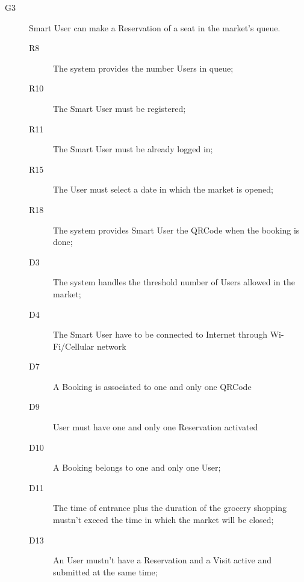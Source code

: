 \begin{description}
    \item[G3]Smart User can make a Reservation of a seat in the market's queue.
    \begin{description}
    \item[R8] The system provides the number Users in queue; %
    \item[R10] The Smart User must be registered;
    \item[R11] The Smart User must be already logged in;
    \item[R15] The User must select a date in which the market is opened;
    \item[R18] The system provides Smart User the QRCode when the booking is done; 
    \item[D3] The system handles the threshold number of Users allowed in the market;
    \item[D4] The Smart User have to be connected to Internet through Wi-Fi/Cellular network
    \item[D7] A Booking is associated to one and only one QRCode
    \item[D9] User must have one and only one Reservation activated
    \item[D10] A Booking belongs to one and only one User;
    \item[D11] The time of entrance plus the duration of the grocery shopping mustn’t exceed the time in which the market will be closed; 
    \item[D13] An User mustn’t have a Reservation and a Visit active and submitted at the same time; 
    \end{description}
    

\end{description}
